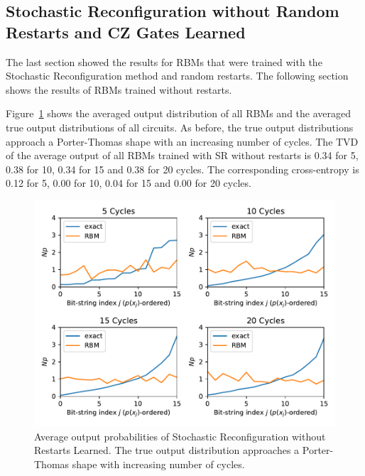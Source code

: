 \newpage

\subsection{Stochastic Reconfiguration without Random Restarts and CZ Gates Learned}

The last section showed the results for RBMs that were trained with the Stochastic Reconfiguration
method and random restarts. The following section shows the results of RBMs trained without restarts.

Figure~\ref{fig:sr_no_restarts_avgPDF} shows the averaged output distribution of all RBMs and
the averaged true output distributions of all circuits. As before, the 
true output distributions approach a Porter-Thomas shape with an increasing number of cycles.
The TVD of the average output of all RBMs trained with SR without restarts
is 0.34 for 5, 0.38 for 10, 0.34 for 15 and 0.38 for 20 cycles. The corresponding cross-entropy is 
0.12 for 5, 0.00 for 10, 0.04 for 15 and 0.00 for 20 cycles.

\begin{figure}[H]
  \centering
  \includegraphics[width=\textwidth]{figures/results/SR-no-restarts-learned/avgPDF.pdf}
  \caption[Average output probabilities of Stochastic Reconfiguration without Restarts Learned]{
    Average output probabilities of Stochastic Reconfiguration without Restarts Learned. The true 
    output distribution approaches a Porter-Thomas shape with increasing number of cycles.}
  \label{fig:sr_no_restarts_avgPDF}
\end{figure}

